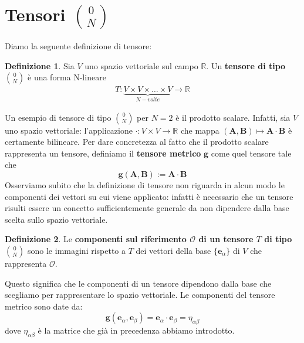 \documentclass[a4paper,11pt]{book}
\theoremstyle{plain}
\theoremstyle{definition}
\newtheorem{defn}{Definizione}[chapter]
\begin{document}
\section{Tensori $\binom{0}{N}$}
Diamo la seguente definizione di tensore:
\begin{defn}
Sia $V$ uno spazio vettoriale sul campo $\mathbb{R}$. Un\textbf{ tensore di tipo $\binom{0}{N}$} è una forma N-lineare 
\[
\begin{matrix} T:\underbrace{ V\times V \times \ldots \times V }_{N-volte} \to \mathbb{R}\end{matrix} 
\]
\end{defn}
Un esempio di tensore di tipo $\binom{0}{N}$ per $N=2$ è il prodotto scalare. Infatti, sia $V$ uno spazio vettoriale: l'applicazione $\cdot : V\times V\to\mathbb{R}$ che mappa $(\textbf{A},\textbf{B})\mapsto \textbf{A}\cdot \textbf{B}$ è certamente bilineare. Per dare concretezza al fatto che il prodotto scalare rappresenta un tensore, definiamo il \textbf{tensore metrico} $\textbf{g}$ come quel tensore tale che
\[
\textbf{g}(\textbf{A},\textbf{B}) := \textbf{A}\cdot \textbf{B}
\]
Osserviamo subito che la definizione di tensore non riguarda in alcun modo le componenti dei vettori su cui viene applicato: infatti è necessario che un tensore risulti essere un concetto sufficientemente generale da non dipendere dalla base scelta sullo spazio vettoriale. 

\begin{defn}
Le \textbf{componenti sul riferimento $\mathcal{O}$ di un tensore $T$ di tipo $\binom{0}{N}$} sono le immagini rispetto a $T$ dei vettori della base $\{ \textbf{e}_{\alpha} \}$ di $V$ che rappresenta $\mathcal{O}$. 
\end{defn}
Questo significa che le componenti di un tensore dipendono dalla base che scegliamo per rappresentare lo spazio vettoriale. Le componenti del tensore metrico sono date da:
\[
\textbf{g}(\textbf{e}_{\alpha},\textbf{e}_{\beta})=\textbf{e}_{\alpha}\cdot \textbf{e}_{\beta}=\eta_{\alpha\beta}
\]
dove $\eta_{\alpha\beta}$ è la matrice che già in precedenza abbiamo introdotto. 
\end{document}
